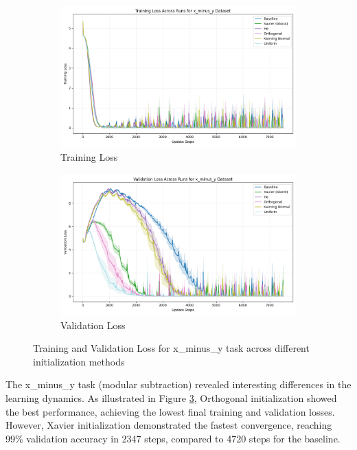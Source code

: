 \documentclass{article} %
\begin{document}
\begin{figure}[h]
    \centering
    \begin{subfigure}{0.49\textwidth}
        \includegraphics[width=\textwidth]{train_loss_x_minus_y.png}
        \caption{Training Loss}
        \label{fig:train_loss_x_minus_y}
    \end{subfigure}
    \hfill
    \begin{subfigure}{0.49\textwidth}
        \includegraphics[width=\textwidth]{val_loss_x_minus_y.png}
        \caption{Validation Loss}
        \label{fig:val_loss_x_minus_y}
    \end{subfigure}
    \caption{Training and Validation Loss for x\_minus\_y task across different initialization methods}
    \label{fig:loss_x_minus_y}
\end{figure}

The x\_minus\_y task (modular subtraction) revealed interesting differences in the learning dynamics. As illustrated in Figure \ref{fig:loss_x_minus_y}, Orthogonal initialization showed the best performance, achieving the lowest final training and validation losses. However, Xavier initialization demonstrated the fastest convergence, reaching 99\% validation accuracy in 2347 steps, compared to 4720 steps for the baseline.
\end{document}
